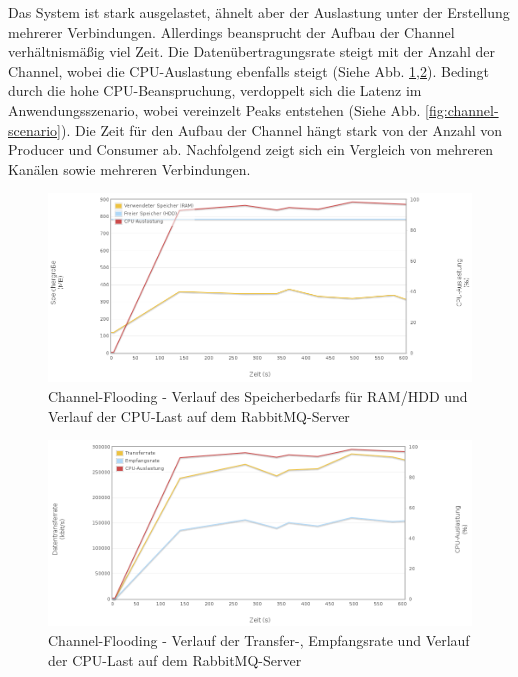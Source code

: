 \documentclass[	a4paper,
			11pt,
			oneside,
			parskip]{scrartcl}
\begin{document}
	
	\clearpage
		{%
		  \newline
		  \newline
		  \newline
		}{%
		 Das System ist stark ausgelastet, ähnelt aber der Auslastung unter der Erstellung mehrerer Verbindungen. Allerdings beansprucht der Aufbau der Channel verhältnismäßig viel Zeit.
		 Die Datenübertragungsrate steigt mit der Anzahl der Channel, wobei die CPU-Auslastung ebenfalls steigt (Siehe Abb. \ref{fig:channel-server1},\ref{fig:channel-server2}).
		 Bedingt durch die hohe CPU-Beanspruchung, verdoppelt sich die Latenz im Anwendungsszenario,
		 wobei vereinzelt Peaks entstehen (Siehe Abb. \ref{fig:channel-scenario}).
		}{%
		 Die Zeit für den Aufbau der Channel hängt stark von der Anzahl von Producer und Consumer ab. Nachfolgend zeigt sich ein Vergleich von mehreren Kanälen sowie mehreren Verbindungen.
		}

		\begin{figure}[!htb]
			\centering
			\includegraphics[width=\textwidth]{img/channel/channel_server1.png}
			\caption{Channel-Flooding - Verlauf des Speicherbedarfs für RAM/HDD und Verlauf der CPU-Last auf dem RabbitMQ-Server}
			\label{fig:channel-server1}
		\end{figure}
		
		\begin{figure}[!htb]
			\centering
			\includegraphics[width=\textwidth]{img/channel/channel_server2.png}
			\caption{Channel-Flooding - Verlauf der Transfer-, Empfangsrate und Verlauf der CPU-Last auf dem RabbitMQ-Server}
			\label{fig:channel-server2}
		\end{figure}
		
\end{document}

